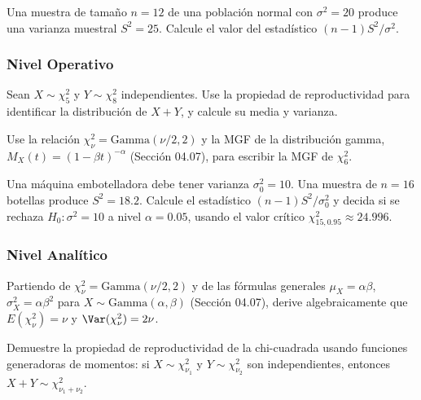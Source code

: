 \begin{problema}
	\label{prob:5.3.3}
	Una muestra de tamaño $n=12$ de una población normal con $\sigma^2=20$ produce una varianza muestral $S^2=25$. Calcule el valor del estadístico $(n-1)S^2/\sigma^2$.
\end{problema}

\subsubsection*{Nivel Operativo}

\begin{problema}
	\label{prob:5.3.4}
	Sean $X \sim \chi^2_5$ y $Y \sim \chi^2_8$ independientes. Use la propiedad de reproductividad para identificar la distribución de $X+Y$, y calcule su media y varianza.
\end{problema}

\begin{problema}
	\label{prob:5.3.5}
	Use la relación $\chi^2_\nu = \text{Gamma}(\nu/2, 2)$ y la MGF de la distribución gamma, $M_{X}(t)=(1-\beta t)^{-\alpha}$ (Sección 04.07), para escribir la MGF de $\chi^2_6$.
\end{problema}

\begin{problema}
	\label{prob:5.3.6}
	Una máquina embotelladora debe tener varianza $\sigma_0^2=10$. Una muestra de $n=16$ botellas produce $S^2=18.2$. Calcule el estadístico $(n-1)S^2/\sigma_0^2$ y decida si se rechaza $H_0: \sigma^2=10$ a nivel $\alpha=0.05$, usando el valor crítico $\chi^2_{15,0.95}\approx 24.996$.
\end{problema}

\subsubsection*{Nivel Analítico}

\begin{problema}
	\label{prob:5.3.7}
	Partiendo de $\chi^2_\nu = \text{Gamma}(\nu/2, 2)$ y de las fórmulas generales $\mu_X=\alpha\beta$, $\sigma_X^2=\alpha\beta^2$ para $X\sim\text{Gamma}(\alpha,\beta)$ (Sección 04.07), derive algebraicamente que $E(\chi^2_\nu)=\nu$ y $\Var(\chi^2_\nu)=2\nu$.
\end{problema}

\begin{problema}
	\label{prob:5.3.8}
	Demuestre la propiedad de reproductividad de la chi-cuadrada usando funciones generadoras de momentos: si $X\sim\chi^2_{\nu_1}$ y $Y\sim\chi^2_{\nu_2}$ son independientes, entonces $X+Y\sim\chi^2_{\nu_1+\nu_2}$.
\end{problema}

